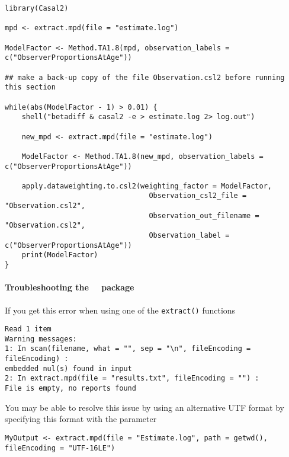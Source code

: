 \begin{lstlisting}
library(Casal2)

mpd <- extract.mpd(file = "estimate.log")

ModelFactor <- Method.TA1.8(mpd, observation_labels = c("ObserverProportionsAtAge"))

## make a back-up copy of the file Observation.csl2 before running this section

while(abs(ModelFactor - 1) > 0.01) {
	shell("betadiff & casal2 -e > estimate.log 2> log.out")

	new_mpd <- extract.mpd(file = "estimate.log")

	ModelFactor <- Method.TA1.8(new_mpd, observation_labels = c("ObserverProportionsAtAge"))

	apply.dataweighting.to.csl2(weighting_factor = ModelFactor,
                                  Observation_csl2_file = "Observation.csl2",
                                  Observation_out_filename = "Observation.csl2",
                                  Observation_label = c("ObserverProportionsAtAge"))
	print(ModelFactor)
}
\end{lstlisting}

\paragraph*{Troubleshooting the \cname\ \R\ package}

If you get this error when using one of the \texttt{extract()} functions

\begin{lstlisting}
Read 1 item
Warning messages:
1: In scan(filename, what = "", sep = "\n", fileEncoding = fileEncoding) :
embedded nul(s) found in input
2: In extract.mpd(file = "results.txt", fileEncoding = "") :
File is empty, no reports found
\end{lstlisting}

You may be able to resolve this issue by using an alternative UTF format by specifying this format with the  parameter

\begin{lstlisting}
MyOutput <- extract.mpd(file = "Estimate.log", path = getwd(), fileEncoding = "UTF-16LE")
\end{lstlisting}
